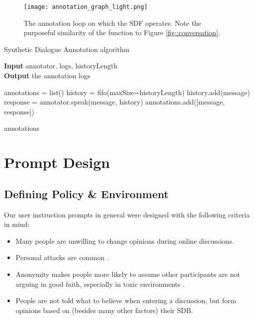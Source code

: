 \begin{figure}
	\centering
	\texttt{[image: annotation\_graph\_light.png]}
	\caption{The annotation loop on which the \ac{SDF} operates. Note the purposeful similarity of the function to Figure \ref{fig::conversation}.}
	\label{fig::annotation}
\end{figure}

\begin{algorithm}
	\caption{Synthetic Dialogue Annotation algorithm} 
	\label{al::dialogue-annotation}
	\hspace*{\algorithmicindent} \textbf{Input} annotator, logs, historyLength\\
	\hspace*{\algorithmicindent} \textbf{Output} the annotation logs
	\begin{algorithmic}[1]	
		\State annotations = list()
		\State history = fifo(maxSize=historyLength)
		\State 
		\State history.add(message)
		\State response = annotator.speak(message, history)
		\State annotations.add([message, response])
		\EndFor
		
		\State \Return annotations
	\end{algorithmic} 
\end{algorithm}


\section{Prompt Design}
\label{sec:system:design-prompt}

\subsection{Defining Policy \& Environment}

Our user instruction prompts in general were designed with the following criteria in mind:

\begin{itemize}
	\item Many people are unwilling to change opinions during online discussions.
	
	\item Personal attacks are common \cite{dekock2022disagree}.
	
	\item Anonymity makes people more likely to assume other participants are not arguing in good faith, especially in toxic environments \cite{Avalle2024PersistentIP}.
	
	\item People are not told what to believe when entering a discussion, but form opinions based on (besides many other factors) their \ac{SDB}. 
	
\end{itemize}

